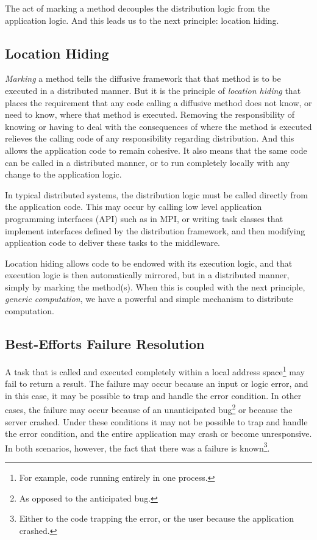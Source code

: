 \documentclass[11pt]{article}
\begin{document}
The act of marking a method decouples the distribution logic from the application logic. And this leads us to the next principle: location hiding.

\subsection{Location Hiding\label{location_hiding}}
\emph{Marking} a method tells the diffusive framework that that method is to be executed in a distributed manner. But it is the principle of \emph{location hiding} that places the requirement that any code calling a diffusive method does not know, or need to know, where that method is executed. Removing the responsibility of knowing or having to deal with the consequences of where the method is executed relieves the calling code of any responsibility regarding distribution. And this allows the application code to remain cohesive. It also means that the same code can be called in a distributed manner, or to run completely locally with any change to the application logic.

In typical distributed systems, the distribution logic must be called directly from the application code. This may occur by calling low level application programming interfaces (API) such as in MPI, or writing task classes that implement interfaces defined by the distribution framework, and then modifying application code to deliver these tasks to the middleware.

Location hiding allows code to be endowed with its execution logic, and that execution logic is then automatically mirrored, but in a distributed manner, simply by marking the method(s). When this is coupled with the next principle, \emph{generic computation}, we have a powerful and simple mechanism to distribute computation.

\subsection{Best-Efforts Failure Resolution\label{sec:best_efforts_failure_resolution}}
A task that is called and executed completely within a local address space\footnote{For example, code running entirely in one process.} may fail to return a result. The failure may occur because an input or logic error, and in this case, it may be possible to trap and handle the error condition. In other cases, the failure may occur because of an unanticipated bug\footnote{As opposed to the anticipated bug.} or because the server crashed. Under these conditions it may not be possible to trap and handle the error condition, and the entire application may crash or become unresponsive. In both scenarios, however, the fact that there was a failure is known\footnote{Either to the code trapping the error, or the user because the application crashed.}.
\end{document}
